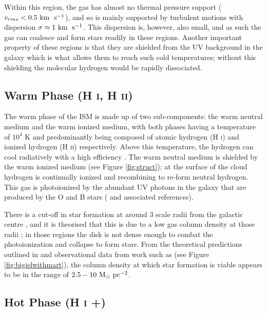 Within this region, the gas has almost no thermal pressure support ($v_{rms} < 0.5 ~\mathrm{km}\;~\mathrm{s}^{-1}$), and so is mainly supported by turbulent motions \citep{larson_turbulence_1981, solomon_mass_1987, heyer_universality_2004} with dispersion $\sigma \approx 1 ~\mathrm{km}\;~\mathrm{s}^{-1}$.
This dispersion is, however, also small, and as such the gas can coalesce and form stars readily in these regions.
Another important property of these regions is that they are shielded from the UV background in the galaxy which is what allows them to reach such cold temperatures; without this shielding the molecular hydrogen would be rapidly dissociated. 

\subsection{Warm Phase (H \textsc{i}, H \textsc{ii})}

The warm phase of the ISM is made up of two sub-components: the warm neutral medium and the warm ionized medium, with both phases having a temperature of $10^4$ K and predominantly being composed of atomic hydrogen (H \textsc{i}) and ionized hydrogen (H \textsc{ii}) respectively.
Above this temperature, the hydrogen can cool radiatively with a high efficiency \citep{gnat_time-dependent_2007}.
The warm neutral medium is shielded by the warm ionized medium (see Figure \ref{fig:struct}); at the surface of the cloud hydrogen is continually ionized and recombining to re-form neutral hydrogen.
This gas is photoionized by the abundant UV photons in the galaxy that are produced by the O and B stars (\citet{lefloch_photoionization_2002} and associated references).

There is a cut-off in star formation at around 3 scale radii from the galactic centre \citep{kennicutt_star_1989, martin_star_2001}, and it is theorised that this is due to a low gas column density at those radii \citep{schaye_star_2004}; in those regions the disk is not dense enough to combat the photoionization and collapse to form stars.
From the theoretical predictions outlined in \citet{schaye_star_2004} and observational data from work such as \citet{bigiel_star_2008} (see Figure \ref{fig:bigielwithmart}), the column density at which star formation is viable appears to be in the range of $2.5 - 10 ~\mathrm{M}_{\odot} ~\mathrm{pc}^{-2}$.

\subsection{Hot Phase (H \textsc{i} +)}

